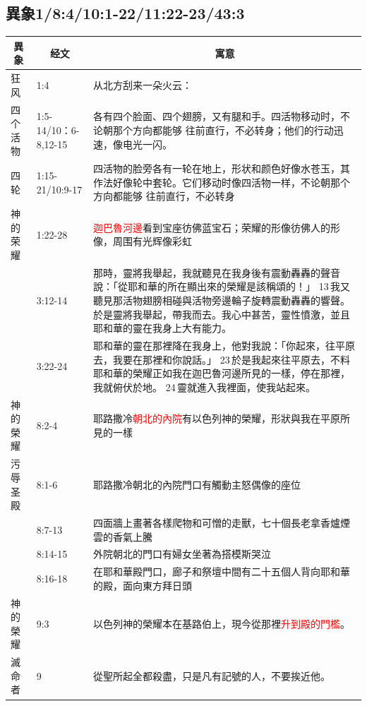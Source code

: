 \subsection{異象1/8:4/10:1-22/11:22-23/43:3}
\begin{table}[H]
\centering
\begin{tabular}{p{1.85cm}|p{2.0cm}|p{13.0cm}}\hline\hline
\multicolumn{1}{c|}{異象}&\multicolumn{1}{c|}{经文}&\multicolumn{1}{c}{寓意}\\\hline
狂风&1:4&从北方刮来一朵火云：\\\hline
四个活物&1:5-14/10：6-8,12-15&各有四个脸面、四个翅膀，又有腿和手。四活物移动时，不论朝那个方向都能够 往前直行，不必转身；他们的行动迅速，像电光一闪。\\\hline
四轮&1:15-21/10:9-17&四活物的脸旁各有一轮在地上，形状和颜色好像水苍玉，其 作法好像轮中套轮。它们移动时像四活物一样，不论朝那个方向都能够 往前直行，不必转身\\\hline
神的荣耀&1:22-28&\textcolor{red}{迦巴魯河邊}看到宝座彷佛蓝宝石；荣耀的形像彷佛人的形像，周围有光辉像彩虹\\\hline

&3:12-14&那時，靈將我舉起，我就聽見在我身後有震動轟轟的聲音說：「從耶和華的所在顯出來的榮耀是該稱頌的！」 13 我又聽見那活物翅膀相碰與活物旁邊輪子旋轉震動轟轟的響聲。於是靈將我舉起，帶我而去。我心中甚苦，靈性憤激，並且耶和華的靈在我身上大有能力。\\\hline

&3:22-24&耶和華的靈在那裡降在我身上，他對我說：「你起來，往平原去，我要在那裡和你說話。」 23 於是我起來往平原去，不料耶和華的榮耀正如我在迦巴魯河邊所見的一樣，停在那裡，我就俯伏於地。 24 靈就進入我裡面，使我站起來。\\\hline

神的榮耀&8:2-4&耶路撒冷\textcolor{red}{朝北的內院}有以色列神的榮耀，形狀與我在平原所見的一樣\\\hline

污辱圣殿&8:1-6&耶路撒冷朝北的內院門口有觸動主怒偶像的座位\\\hline
&8:7-13&四面牆上畫著各樣爬物和可憎的走獸，七十個長老拿香爐煙雲的香氣上騰\\\hline
&8:14-15&外院朝北的門口有婦女坐著為搭模斯哭泣\\\hline
&8:16-18&在耶和華殿門口，廊子和祭壇中間有二十五個人背向耶和華的殿，面向東方拜日頭\\\hline
神的榮耀&9:3&以色列神的榮耀本在基路伯上，現今從那裡\textcolor{red}{升到殿的門檻}。\\\hline
滅命者&9&從聖所起全都殺盡，只是凡有記號的人，不要挨近他。\\\hline


\end{tabular}
\end{table}
